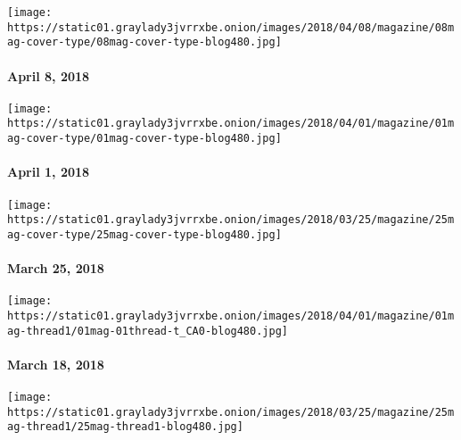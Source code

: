 \href{https://www.nytimes3xbfgragh.onion/issue/magazine/2018/04/12/4818-issue}{}

\texttt{[image: https://static01.graylady3jvrrxbe.onion/images/2018/04/08/magazine/08mag-cover-type/08mag-cover-type-blog480.jpg]}

\hypertarget{april-8-2018}{%
\paragraph{April 8, 2018}\label{april-8-2018}}

\href{https://www.nytimes3xbfgragh.onion/issue/magazine/2018/03/30/4118-issue}{}

\texttt{[image: https://static01.graylady3jvrrxbe.onion/images/2018/04/01/magazine/01mag-cover-type/01mag-cover-type-blog480.jpg]}

\hypertarget{april-1-2018}{%
\paragraph{April 1, 2018}\label{april-1-2018}}

\href{https://www.nytimes3xbfgragh.onion/issue/magazine/2018/03/30/32518-issue}{}

\texttt{[image: https://static01.graylady3jvrrxbe.onion/images/2018/03/25/magazine/25mag-cover-type/25mag-cover-type-blog480.jpg]}

\hypertarget{march-25-2018}{%
\paragraph{March 25, 2018}\label{march-25-2018}}

\href{https://www.nytimes3xbfgragh.onion/issue/magazine/2018/03/30/31818-issue}{}

\texttt{[image: https://static01.graylady3jvrrxbe.onion/images/2018/04/01/magazine/01mag-thread1/01mag-01thread-t\_CA0-blog480.jpg]}

\hypertarget{march-18-2018}{%
\paragraph{March 18, 2018}\label{march-18-2018}}

\href{https://www.nytimes3xbfgragh.onion/interactive/2018/03/08/magazine/25-songs-future-of-music.html}{}

\texttt{[image: https://static01.graylady3jvrrxbe.onion/images/2018/03/25/magazine/25mag-thread1/25mag-thread1-blog480.jpg]}

